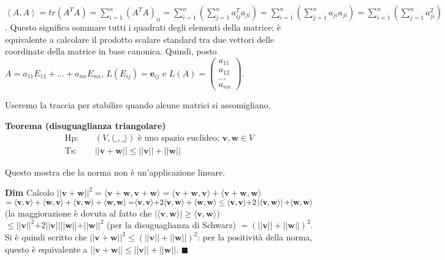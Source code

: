 \documentclass{article}
\begin{document}
\begin{enumerate}
$\left\langle A,A\right\rangle =tr\left( A^{T}A\right) =\sum_{i=1}^{n}\left(
A^{T}A\right) _{ii}=\sum_{i=1}^{n}\left(
\sum_{j=1}^{n}a_{ij}^{T}a_{ji}\right) =\sum_{i=1}^{n}\left(
\sum_{j=1}^{n}a_{ji}a_{ji}\right) =\sum_{i=1}^{n}\left(
\sum_{j=1}^{n}a_{ji}^{2}\right) $. Questo significa sommare tutti i quadrati
degli elementi della matrice: \`{e} equivalente a calcolare il prodotto
scalare standard tra due vettori delle coordinate della matrice in base
canonica. Quindi, posto $A=a_{11}E_{11}+...+a_{nn}E_{nn}$, $L\left(
E_{ij}\right) =\mathbf{e}_{ij}$ e $L\left( A\right) =\left( 
\begin{array}{c}
a_{11} \\ 
a_{12} \\ 
... \\ 
a_{nn}%
\end{array}%
\right) $.

Useremo la traccia per stabilire quando alcune matrici si assomigliano.
\end{enumerate}

\textbf{Teorema (disuguaglianza triangolare)}%
\begin{eqnarray*}
\text{Hp}\text{: } &&\left( V,\langle \_,\_\mathbf{\rangle }\right) \text{ 
\`{e} uno spazio euclideo; }\mathbf{v,w}\in V \\
\text{Ts}\text{: } &&\left\vert \left\vert \mathbf{v+w}\right\vert
\right\vert \leq \left\vert \left\vert \mathbf{v}\right\vert \right\vert
+\left\vert \left\vert \mathbf{w}\right\vert \right\vert
\end{eqnarray*}

Questo mostra che la norma non \`{e} un'applicazione lineare.

\textbf{Dim} Calcolo $\left\vert \left\vert \mathbf{v+w}\right\vert
\right\vert ^{2}=\mathbf{\langle v+w,v+w\rangle =\langle v+w,v\rangle
+\langle v+w,w\rangle }$ $\mathbf{=\langle v,v\rangle +\langle w,v\rangle
+\langle v,w\rangle +\langle w,w\rangle =}


\mathbf{\langle v,v\rangle +}2\mathbf{%
\langle v,w\rangle +\langle w,w\rangle \leq \langle v,v\rangle +}2\left\vert 
\mathbf{\langle v,w\rangle }\right\vert \mathbf{+\langle w,w\rangle }$ (la
maggiorazione \`{e} dovuta al fatto che $\left\vert \mathbf{\langle
v,w\rangle }\right\vert \geq \mathbf{\langle v,w\rangle }$) $\leq \left\vert
\left\vert \mathbf{v}\right\vert \right\vert ^{2}\mathbf{+}2\left\vert
\left\vert \mathbf{v}\right\vert \right\vert \left\vert \left\vert \mathbf{w}%
\right\vert \right\vert \mathbf{+}\left\vert \left\vert \mathbf{w}%
\right\vert \right\vert ^{2}$ (per la disuguaglianza di Schwarz) $=\left(
\left\vert \left\vert \mathbf{v}\right\vert \right\vert +\left\vert
\left\vert \mathbf{w}\right\vert \right\vert \right) ^{2}$. Si \`{e} quindi
scritto che $\left\vert \left\vert \mathbf{v}+\mathbf{w}\right\vert
\right\vert ^{2}\leq \left( \left\vert \left\vert \mathbf{v}\right\vert
\right\vert +\left\vert \left\vert \mathbf{w}\right\vert \right\vert \right)
^{2}$: per la positivit\`{a} della norma, questo \`{e} equivalente a $%
\left\vert \left\vert \mathbf{v}+\mathbf{w}\right\vert \right\vert \leq
\left\vert \left\vert \mathbf{v}\right\vert \right\vert +\left\vert
\left\vert \mathbf{w}\right\vert \right\vert $. $\blacksquare $
\end{document}
